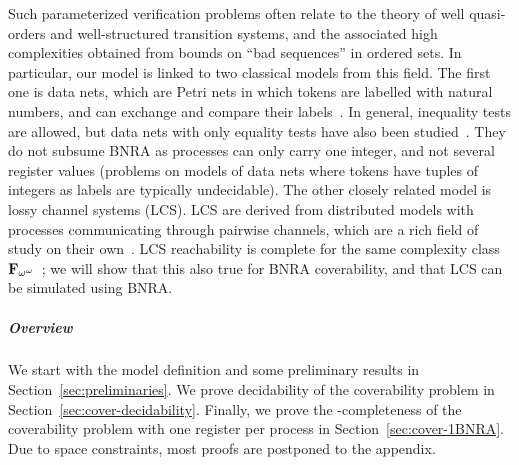 Such parameterized verification problems often relate to the theory of well quasi-orders and well-structured transition systems, and the associated high complexities obtained from bounds on ``bad sequences'' in ordered sets. In particular, our model is linked to two classical models from this field. The first one is data nets, which are Petri nets in which tokens are labelled with natural numbers, and can exchange and compare their labels~\cite{LazicNORW08}. In general, inequality tests are allowed, but data nets with only equality tests have also been studied~\cite{Rosa-Velardo17}. They do not subsume BNRA as processes can only carry one integer, and not several register values (problems on models of data nets where tokens have tuples of integers as labels are typically undecidable).
The other closely related model is lossy channel systems (LCS)\cite{AbdullaJ1996verif}. LCS are derived from distributed models with processes communicating through pairwise channels, which are a rich field of study on their own~\cite{Aiswarya2015model,Aiswarya2020networks}. LCS reachability is complete for the same complexity class $\mathbf{F}_{\omega^\omega}$~\cite{ChambartS08ordinal, Schnoebelen2002verifying}; we will show that this also true for BNRA coverability, and that LCS can be simulated using BNRA.

\subparagraph*{Overview}
We start with the model definition and some preliminary results in Section~\ref{sec:preliminaries}. We prove decidability of the coverability problem in Section~\ref{sec:cover-decidability}. 
Finally, we prove the \NP-completeness of the coverability problem with one register per process in Section~\ref{sec:cover-1BNRA}.
Due to space constraints, most proofs are postponed to the appendix.


